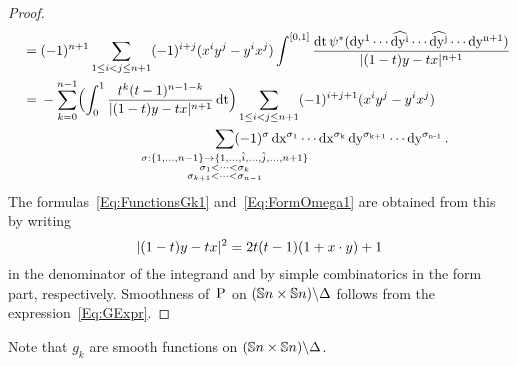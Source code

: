 \documentclass[\MainFolder/Text.tex]{subfiles}
\begin{document}
\begin{proof}
\begin{align*}
 & \quad = (-1)^{n+1} \sum_{1\le i<j \le n+1} (-1)^{i+j}(x^i y^j - y^i x^j) \FInt{[0,1]}  \frac{\Diff{t} \psi^*(\Diff{y^1} \dotsm \widehat{\Diff{y^i}} \dotsm \widehat{\Diff{y^j}} \dotsm \Diff{y^{n+1}})}{\Abs{(1-t)y-tx}^{n+1}} \\ 
 & \quad = \begin{multlined}[t] - \sum_{k=0}^{n-1} \Bigl(\int_0^1 \frac{t^k(t-1)^{n-1-k}}{\Abs{(1-t)y-tx}^{n+1}} \Diff{t}\Bigr) \sum_{1\le i<j\le n+1} (-1)^{i+j+1} (x^i y^j - y^i x^j) \\
 \sum_{\mathclap{\substack{\sigma: \{1,\dotsc,n-1\}\rightarrow \{1,\dotsc,\hat{i},\dotsc,\hat{j},\dotsc,n+1\} \\ \sigma_1<\dots < \sigma_k \\ \sigma_{k+1}<\dots < \sigma_{n-1}}}} (-1)^\sigma \Diff{x^{\sigma_1}} \dotsm \Diff{x^{\sigma_k}}\Diff{y^{\sigma_{k+1}}} \dotsm \Diff{y^{\sigma_{n-1}}}.\end{multlined}
\end{align*}
The formulas~\eqref{Eq:FunctionsGk1} and~\eqref{Eq:FormOmega1} are obtained from this by writing 
\[ |(1-t)y - tx|^2 = 2t(t-1)(1+x \cdot y) + 1 \]
in the denominator of the integrand and by simple combinatorics in the form part, respectively. Smoothness of~$\mathrm{P}$ on $(\mathbb{S}{n}\times \mathbb{S}{n})\backslash \Delta$ follows from the expression~\eqref{Eq:GExpr}.
\end{proof}
Note that $g_k$ are smooth functions on $(\mathbb{S}{n}\times \mathbb{S}{n})\backslash \Delta$.
%
\end{document}

